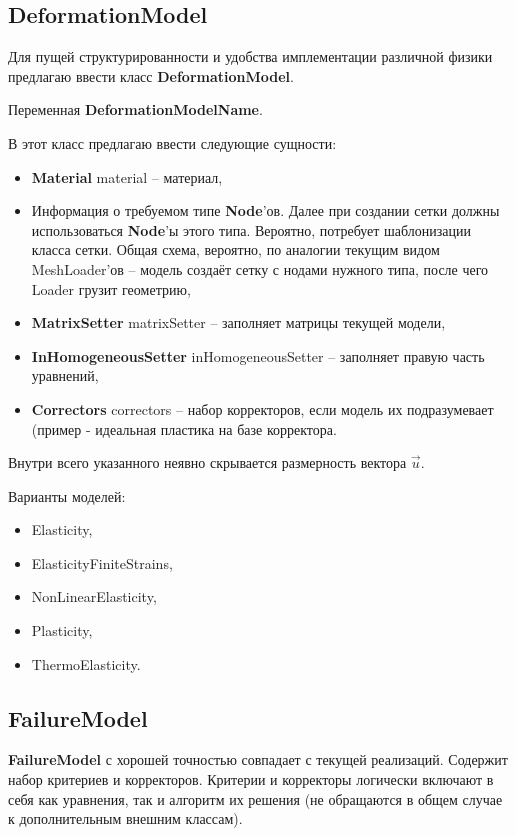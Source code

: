 \documentclass[a4paper,12pt]{article}
\numberwithin{equation}{section}
\begin{document}
\subsection{DeformationModel}
	Для пущей структурированности и удобства имплементации различной физики предлагаю ввести класс \textbf{DeformationModel}.
	
	Переменная \textbf{DeformationModelName}.

	В этот класс предлагаю ввести следующие сущности:
	\begin{itemize}
		\item{\textbf{Material} material -- материал,}
		\item{Информация о требуемом типе \textbf{Node}'ов. Далее при создании сетки должны использоваться \textbf{Node}'ы этого типа. Вероятно, потребует шаблонизации класса сетки. Общая схема, вероятно, по аналогии текущим видом MeshLoader'ов -- модель создаёт сетку с нодами нужного типа, после чего Loader грузит геометрию,}
		\item{\textbf{MatrixSetter} matrixSetter -- заполняет матрицы текущей модели,}
		\item{\textbf{InHomogeneousSetter} inHomogeneousSetter -- заполняет правую часть уравнений,}
		\item{\textbf{Correctors} correctors -- набор корректоров, если модель их подразумевает (пример - идеальная пластика на базе корректора.}
	\end{itemize}

	Внутри всего указанного неявно скрывается размерность вектора $\vec{u}$.
	
	Варианты моделей:
	\begin{itemize}
		\item{Elasticity,}
		\item{ElasticityFiniteStrains,}
		\item{NonLinearElasticity,}
		\item{Plasticity,}
		\item{ThermoElasticity.}
	\end{itemize}
	
\subsection{FailureModel}

	\textbf{FailureModel} с хорошей точностью совпадает с текущей реализаций. Содержит набор критериев и корректоров. Критерии и корректоры логически включают в себя как уравнения, так и алгоритм их решения (не обращаются в общем случае к дополнительным внешним классам). 
	
\end{document}
